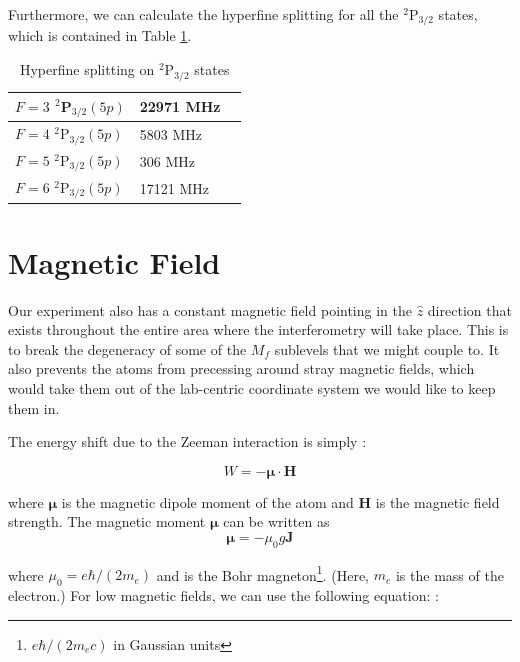Furthermore, we can calculate the hyperfine splitting for all the $^2$P$_{3/2}$ states, which is contained in Table \ref{tableOfHyperfine deetuings}.

\begin{table}[h]
\centering
\begin{tabular}{|l|l|||r|}
\hline
$F=3$ $^2$P$_{3/2} (5p)$ & 22971  MHz\\ \hline
$F=4$ $^2$P$_{3/2} (5p)$ &  5803 MHz\\ \hline
$F=5$ $^2$P$_{3/2} (5p)$ &  306 MHz\\ \hline
$F=6$ $^2$P$_{3/2} (5p)$ &   17121 MHz\\ \hline
\end{tabular}
\caption{Hyperfine splitting on $^2$P$_{3/2}$ states}
\label{tableOfHyperfine deetuings}
\end{table}

\section{Magnetic Field}

Our experiment also has a constant magnetic field pointing in the $\hat{z}$ direction that exists throughout the entire area where the interferometry will take place. This is to break the degeneracy of some of the $M_f$ sublevels that we might couple to. It also prevents the atoms from precessing around stray magnetic fields, which would take them out of the lab-centric coordinate system we would like to keep them in.

The energy shift due to the Zeeman interaction is simply \cite{sobelman_spectra}: 

\begin{equation}
W=-\mathbf{\mu}\cdot\mathbf{H}
\end{equation}

where $\mathbf{\mu}$ is the magnetic dipole moment of the atom and $\mathbf{H}$ is the magnetic field strength. The magnetic moment $\mathbf{\mu}$ can be written as \cite{sobelman_spectra}
\begin{equation}
\mathbf{\mu}=-\mu_0 g \mathbf{J}
\end{equation}

where $\mu_0=e\hbar/(2 m_e)$ and is the Bohr magneton\footnote{$e \hbar / (2 m_e c)$ in Gaussian units}. (Here, $m_e$ is the mass of the electron.)
For low magnetic fields, we can use the following equation: \cite{sobelman_spectra}:

